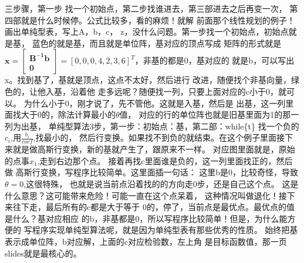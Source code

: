 {{}
	{
		三步骤，第一步
	找一个初始点，第二步找谁进去，第三部进去之后再变一次，
	第四部就是什么时候停。公式比较多，看的麻烦！就解
	前面那个线性规划的例子！画出单纯型表，写上A，b，c，
	z，没什么问题。第一步找一个初始点，初始点就是基，
	蓝色的就是基，而且就是单位阵，基对应的顶点写成
	矩阵的形式就是$\mathbf{x=\left[\begin{array}{c}\mathbf{B^{-1}b}\\\mathbf{0}\end{array}\right]}= [ 0, 0, 0, 4, 2, 3, 6 ]^T$，非基的都是0，基对应的
	就是b，可以写出x。找到基了，基就是顶点，这点不太好，然后进行
	改进，随便找个非基向量，绿色的，让他入基，沿着他
	走多远呢？随便找一列，只要上面对应的c小于0，就可以。
	为什么小于0，刚才说了，先不管他。这就是入基，然后是
	出基，这一列里面找大于0的，除法计算最小的$\theta$值，
	对应的行的单位阵也就是旧基里面为1的那一列为出基，
	单纯型算法3步，第一步：初始点：基，第二部：while\{t\}
	找一个负的$c_{i}$,用$\frac{b_{i}}{coef}$,找最小的，
	然后行变换。如果找不到负的就结束。在这个例子里面接下
	来就是做高斯行变换，新的基就产生了，跟原来不一样。
	对应图里面就是，原始的点事$x_{1}$,走到右边那个点。
	接着再找c里面谁是负的，这一列里面找正的，然后做
	高斯行变换，写程序比较简单。这里面插一句话：
	这里b是0，比较奇怪，导致$\theta = 0$,这很特殊，
	也就是说当前点沿着找的的方向走0步，还是自己这个点。
	这是什么意思？这可能带来危险！可能一直在这个点呆着，
	这种情况叫做退化！接下来往下走，最后所有的c都是大于等于
	0的，停了，当前点是最优点。最优点的值是什么？基对应相应
	的b，非基都是0，所以写程序比较简单！但是，为什么能方便的
	写程序实现单纯型算法呢，就是因为单纯型表有那些优秀的性质。
	始终把基表示成单位阵，b对应解，上面的c对应检验数，左上角
	是目标函数值，那一页slides就是最核心的。


}}
